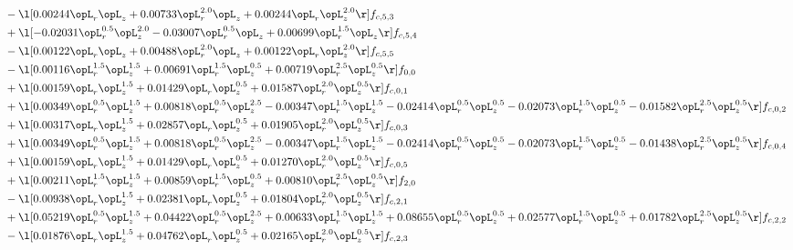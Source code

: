 \begin{alignat}{2}
& - \l[  0.00244 \opL_r \opL_z +  0.00733 \opL_r^{2.0} \opL_z +  0.00244 \opL_r \opL_z^{2.0}  \r] f_{c,5,3} \nonumber \\ 
& + \l[  -0.02031 \opL_r^{0.5} \opL_z^{2.0}   -0.03007 \opL_r^{0.5} \opL_z +  0.00699 \opL_r^{1.5} \opL_z  \r] f_{c,5,4} \nonumber \\ 
& - \l[  0.00122 \opL_r \opL_z +  0.00488 \opL_r^{2.0} \opL_z +  0.00122 \opL_r \opL_z^{2.0}  \r] f_{c,5,5} \nonumber \\ 
& - \l[  0.00116 \opL_r^{1.5} \opL_z^{1.5} +  0.00691 \opL_r^{1.5} \opL_z^{0.5} +  0.00719 \opL_r^{2.5} \opL_z^{0.5}  \r] f_{0,0} \nonumber \\ 
& + \l[  0.00159 \opL_r \opL_z^{1.5} +  0.01429 \opL_r \opL_z^{0.5} +  0.01587 \opL_r^{2.0} \opL_z^{0.5}  \r] f_{c,0,1} \nonumber \\ 
& + \l[  0.00349 \opL_r^{0.5} \opL_z^{1.5} +  0.00818 \opL_r^{0.5} \opL_z^{2.5}   -0.00347 \opL_r^{1.5} \opL_z^{1.5}   -0.02414 \opL_r^{0.5} \opL_z^{0.5}   -0.02073 \opL_r^{1.5} \opL_z^{0.5}   -0.01582 \opL_r^{2.5} \opL_z^{0.5}  \r] f_{c,0,2} \nonumber \\ 
& + \l[  0.00317 \opL_r \opL_z^{1.5} +  0.02857 \opL_r \opL_z^{0.5} +  0.01905 \opL_r^{2.0} \opL_z^{0.5}  \r] f_{c,0,3} \nonumber \\ 
& + \l[  0.00349 \opL_r^{0.5} \opL_z^{1.5} +  0.00818 \opL_r^{0.5} \opL_z^{2.5}   -0.00347 \opL_r^{1.5} \opL_z^{1.5}   -0.02414 \opL_r^{0.5} \opL_z^{0.5}   -0.02073 \opL_r^{1.5} \opL_z^{0.5}   -0.01438 \opL_r^{2.5} \opL_z^{0.5}  \r] f_{c,0,4} \nonumber \\ 
& + \l[  0.00159 \opL_r \opL_z^{1.5} +  0.01429 \opL_r \opL_z^{0.5} +  0.01270 \opL_r^{2.0} \opL_z^{0.5}  \r] f_{c,0,5} \nonumber \\ 
& + \l[  0.00211 \opL_r^{1.5} \opL_z^{1.5} +  0.00859 \opL_r^{1.5} \opL_z^{0.5} +  0.00810 \opL_r^{2.5} \opL_z^{0.5}  \r] f_{2,0} \nonumber \\ 
& - \l[  0.00938 \opL_r \opL_z^{1.5} +  0.02381 \opL_r \opL_z^{0.5} +  0.01804 \opL_r^{2.0} \opL_z^{0.5}  \r] f_{c,2,1} \nonumber \\ 
& + \l[  0.05219 \opL_r^{0.5} \opL_z^{1.5} +  0.04422 \opL_r^{0.5} \opL_z^{2.5} +  0.00633 \opL_r^{1.5} \opL_z^{1.5} +  0.08655 \opL_r^{0.5} \opL_z^{0.5} +  0.02577 \opL_r^{1.5} \opL_z^{0.5} +  0.01782 \opL_r^{2.5} \opL_z^{0.5}  \r] f_{c,2,2} \nonumber \\ 
& - \l[  0.01876 \opL_r \opL_z^{1.5} +  0.04762 \opL_r \opL_z^{0.5} +  0.02165 \opL_r^{2.0} \opL_z^{0.5}  \r] f_{c,2,3} \nonumber \\ 

\end{alignat}
